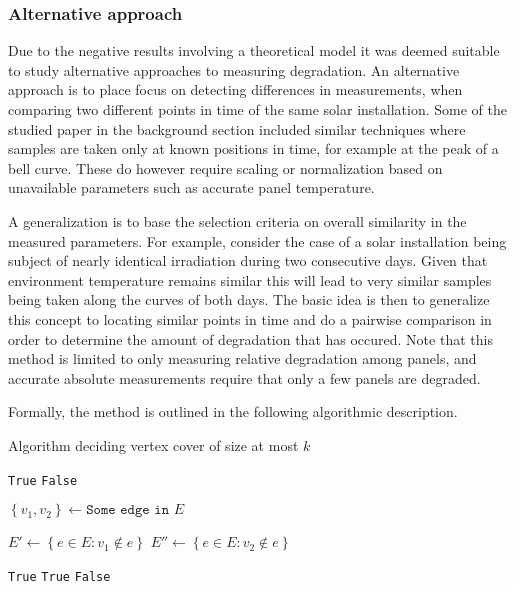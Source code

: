\subsubsection{Alternative approach}
Due to the negative results involving a theoretical model it was deemed suitable to study alternative approaches to measuring degradation.
An alternative approach is to place focus on detecting differences in measurements, when comparing two different points in time of the same solar installation.
Some of the studied paper in the background section included similar techniques where samples are taken only at known positions in time, for example at the peak of a bell curve.
These do however require scaling or normalization based on unavailable parameters such as accurate panel temperature.

A generalization is to base the selection criteria on overall similarity in the measured parameters.
For example, consider the case of a solar installation being subject of nearly identical irradiation during two consecutive days.
Given that environment temperature remains similar this will lead to very similar samples being taken along the curves of both days.
The basic idea is then to generalize this concept to locating similar points in time and do a pairwise comparison in order to determine the amount of degradation that has occured.
Note that this method is limited to only measuring relative degradation among panels, and accurate absolute measurements require that only a few panels are degraded.

Formally, the method is outlined in the following algorithmic description.

\begin{algorithm}
\begin{algorithmic}
\caption{Algorithm deciding vertex cover of size at most $k$}
\label{fpt-vertex-cover}
    \Return \texttt{True}
    \Return \texttt{False}
\EndIf

\State $\left\{v_1, v_2\right\} \gets \texttt{Some edge in } E$

\State $E'\gets \left\{ e \in E : v_1 \not \in e \right\}$
\State $E''\gets \left\{ e \in E : v_2 \not \in e \right\}$

    \Return \texttt{True}
    \Return \texttt{True}
\Else {}
    \Return \texttt{False}
\EndIf

\EndProcedure
\end{algorithmic}
\end{algorithm}

